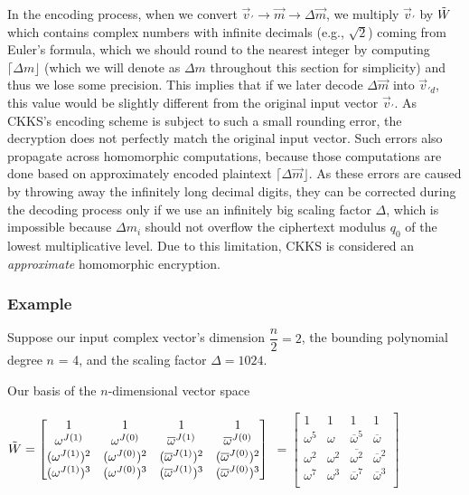  In the encoding process, when we convert $\vec{v}_{'} \rightarrow \vec{m} \rightarrow \Delta\vec{m}$, we multiply $\vec{v}_{'}$ by $\tilde{W}$ which contains complex numbers with infinite decimals (e.g., $\sqrt{2}$) coming from Euler's formula, which we should round to the nearest integer by computing $\lceil \Delta m \rfloor$ (which we will denote as $\Delta m$ throughout this section for simplicity) and thus we lose some precision. This implies that if we later decode $\Delta\vec{m}$ into $\vec{v}_{'d}$, this value would be slightly different from the original input vector $\vec{v}_{'}$. As CKKS's encoding scheme is subject to such a small rounding error, the decryption does not perfectly match the original input vector. Such errors also propagate across homomorphic computations, because those computations are done based on approximately encoded plaintext $\lceil \Delta \vec{m} \rfloor$. As these errors are caused by throwing away the infinitely long decimal digits, they can be corrected during the decoding process only if we use an infinitely big scaling factor $\Delta$, which is impossible because $\Delta m_i$ should not overflow the ciphertext modulus $q_0$ of the lowest multiplicative level. Due to this limitation, CKKS is considered an \textit{approximate} homomorphic encryption. 


\subsubsection{Example}
\label{subsubsec:ckks-encoding-ex}


Suppose our input complex vector's dimension $\dfrac{n}{2} = 2$, the bounding polynomial degree $n$ = 4, and the scaling factor $\Delta = 1024$. 

Our basis of the $n$-dimensional vector space 

$\tilde{W}= \begin{bmatrix}
1 & 1 & 1 & 1\\
\omega^{J(1)} & \omega^{J(0)} & \overline{\omega}^{J(1)} & \overline{\omega}^{J(0)}\\
(\omega^{J(1)})^2 & ({\omega^{J(0)}})^2 & (\overline{\omega}^{J(1)})^2 & (\overline{\omega}^{J(0)})^2\\
(\omega^{J(1)})^3 & (\omega^{J(0)})^3 & (\overline{\omega}^{J(1)})^3 & (\overline{\omega}^{J(0)})^3\\
\end{bmatrix}$
$= \begin{bmatrix}
1 & 1 & 1 & 1\\
\omega^5 & \omega & \overline{\omega}^5 & \overline{\omega}\\
\omega^2 & \omega^2 & \overline{\omega^2} & \overline{\omega}^2\\
\omega^7 & \omega^3 & \overline{\omega}^7 & \overline{\omega}^3\\
\end{bmatrix}$

